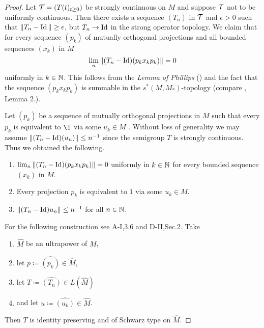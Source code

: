 \begin{proof}
Let $\mathcal{T} = (T(t)_{t \geq 0})$ be strongly continuous on $M$ and suppose $\mathcal{T}$ not to be uniformly continuous.
Then there exists a sequence $(T_n)$  in  $ \mathcal{T} $ and $\epsilon > 0$ such that $\|T_n - \operatorname{Id}\| \geq \epsilon$, 
but $T_n \to \operatorname{Id}$ in the strong operator topology.
We claim that for every sequence $(p_{k})$ of mutually orthogonal projections and all bounded sequences $(x_{k})$ 
in $M$
\[
\lim_n \|(T_n - \operatorname{Id})(p_{k} x_{k} p_{k})\| = 0
\]
uniformly in $k \in \mathbb{N}$.
This follows from the \emph{Lemma of Phillips} (\citet{schaefer:1974}) and the fact that the sequence $(p_{k} x_{k} p_{k})$ is summable in the $s^{*}(M,M_*)$-topology (compare \citet{elliot:1972}, Lemma 2.).

Let $(p_{k})$ be a sequence of mutually orthogonal projections in $M$ such that every $p_{k}$ is equivalent to $\1$ via some $u_{k} \in M$ \cite[2.2]{sakai:1971}.
Without loss of generality we may assume $\|(T_n - \operatorname{Id})(u_n)\| \leq n^{-1}$ since the semigroup $T$ is strongly continuous.
Thus we obtained the following.
\begin{enumerate}[\upshape (i)]
\item 
$\lim_n \|(T_n - \operatorname{Id})(p_{k} x_{k} p_{k})\| = 0$ uniformly in $k \in \mathbb{N}$ for every bounded sequence $(x_{k})$ in $M$.
\item 
Every projection $p_{k}$ is equivalent to $1$ via some $u_{k} \in M$.
\item 
$\|(T_n - \operatorname{Id})u_n\| \leq n^{-1}$ for all $n \in \mathbb{N}$.
\end{enumerate}
For the following construction see A-I,3.6 and D-II,Sec.2.
Take
\begin{enumerate}[\upshape (i)]
\item
$\widehat{M}$ be an ultrapower of $M$,

\item
let $p \coloneq \widehat{(p_{k})} \in \widehat{M}$,

\item
let $T \coloneq \widehat{(T_{n}) }\in L(\widehat{M})$

\item
and let $u \coloneq \widehat{(u_{k})}  \in \widehat{M}$.

\end{enumerate}
Then $T$ is identity preserving and of Schwarz type on $\widehat{M}$.


\end{proof}
